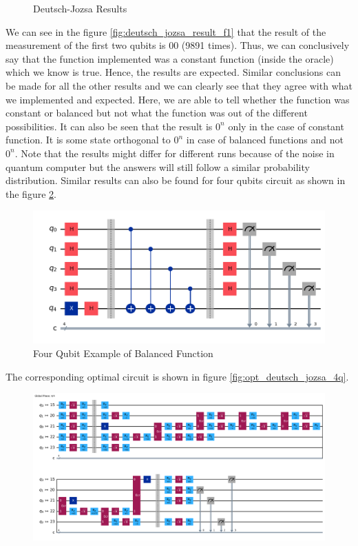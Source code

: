 \documentclass[12pt, oneside]{book}
\theoremstyle{definition}
\theoremstyle{definition}
\theoremstyle{remark}
\begin{document}
\begin{enumerate}
\begin{figure}[H]
\begin{subfigure}[b]{0.45\textwidth}
        \end{subfigure}    
        \caption{Deutsch-Jozsa Results}
        \label{fig:deutsch_jozsa_results}
    \end{figure}
    We can see in the figure \ref{fig:deutsch_jozsa_result_f1} that the result of the measurement of the first two qubits is 00 (9891 times). Thus, we can conclusively say that the function implemented was a constant function (inside the oracle) which we know is true. Hence, the results are expected. Similar conclusions can be made for all the other results and we can clearly see that they agree with what we implemented and expected. Here, we are able to tell whether the function was constant or balanced but not what the function was out of the different possibilities. It can also be seen that the result is $0^n$ only in the case of constant function. It is some state orthogonal to $0^n$ in case of balanced functions and not $0^n$. Note that the results might differ for different runs because of the noise in quantum computer but the answers will still follow a similar probability distribution. Similar results can also be found for four qubits circuit as shown in the figure \ref{fig:deutsch_jozsa_4q}.
    \begin{figure}[H]
        \centering
        \includegraphics[width=0.75\linewidth]{../images/deutsch_jozsa_4q.png}
        \caption{Four Qubit Example of Balanced Function}
        \label{fig:deutsch_jozsa_4q}
    \end{figure}
    The corresponding optimal circuit is shown in figure \ref{fig:opt_deutsch_jozsa_4q}.
    \begin{figure}[H]
        \centering
        \includegraphics[width=0.75\linewidth]{../images/opt_deutsch_jozsa_4q.png}

\end{figure}
\end{enumerate}
\end{document}
